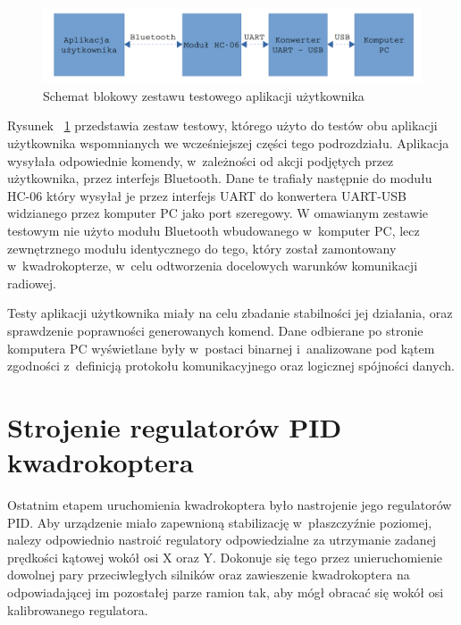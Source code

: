 \documentclass[11pt, twoside]{Thesis} %
\begin{document}
\begin{figure}[H]
	\centering
	\includegraphics[scale=0.2]{Pictures/TestyAplikacji.png}
	\caption[Schemat blokowy zestawu testowego aplikacji użytkownika]{Schemat blokowy zestawu testowego aplikacji użytkownika}
	\label{fig:UserAplication_test}
\end{figure}

Rysunek ~\ref{fig:UserAplication_test} przedstawia zestaw testowy, którego użyto do testów obu aplikacji użytkownika wspomnianych we wcześniejszej części tego podrozdziału. Aplikacja wysyłała odpowiednie komendy, w~zależności od akcji podjętych przez użytkownika, przez interfejs Bluetooth. Dane te trafiały następnie do modułu HC-06 który wysyłał je przez interfejs UART do konwertera UART-USB widzianego przez komputer PC jako port szeregowy. W omawianym zestawie testowym nie użyto modułu Bluetooth wbudowanego w~komputer PC, lecz zewnętrznego modułu identycznego do tego, który został zamontowany w~kwadrokopterze, w~celu odtworzenia docelowych warunków komunikacji radiowej. 

Testy aplikacji użytkownika miały na celu zbadanie stabilności jej działania, oraz sprawdzenie poprawności generowanych komend. Dane odbierane po stronie komputera PC wyświetlane były w~postaci binarnej i~analizowane pod kątem zgodności z~definicją protokołu komunikacyjnego oraz logicznej spójności danych.

\section{Strojenie regulatorów PID kwadrokoptera}

Ostatnim etapem uruchomienia kwadrokoptera było nastrojenie jego regulatorów PID. Aby urządzenie miało zapewnioną stabilizację w~płaszczyźnie poziomej, nalezy odpowiednio nastroić regulatory odpowiedzialne za utrzymanie zadanej prędkości kątowej wokół osi X oraz Y. Dokonuje się tego przez unieruchomienie dowolnej pary przeciwległych silników oraz zawieszenie kwadrokoptera na odpowiadającej im pozostałej parze ramion tak, aby mógł obracać się wokół osi kalibrowanego regulatora.
\end{document}
